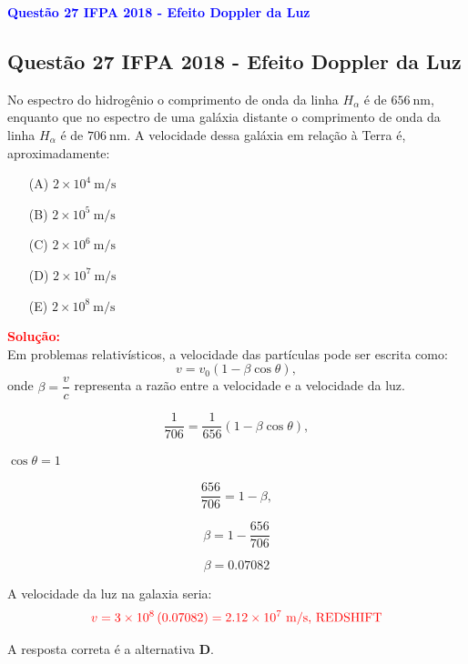 \begin{flushleft}
\textbf{\textcolor{blue}{\Large Quest\~ao 27 IFPA 2018 - Efeito Doppler da Luz}}\\
\noindent

\subsection{Quest\~ao 27 IFPA 2018 - Efeito Doppler da Luz}

No espectro do hidrogênio o comprimento de onda da linha $H_\alpha$ é de $656\ \text{nm}$, enquanto que no 
espectro de uma galáxia distante o comprimento de onda da linha $H_\alpha$ é de $706\ \text{nm}$. A velocidade dessa 
galáxia em relação à Terra é, aproximadamente:

\begin{itemize}
\item[(A)] $2 \times 10^4\ \text{m/s}$
\item[(B)] $2 \times 10^5\ \text{m/s}$
\item[(C)] $2 \times 10^6\ \text{m/s}$
\item[(D)] $2 \times 10^7\ \text{m/s}$
\item[(E)] $2 \times 10^8\ \text{m/s}$
\end{itemize}

\vspace{0.5cm}

\textcolor{red}{\textbf{Solução:}}\\

Em problemas relativ\'isticos, a velocidade das part\'iculas pode ser escrita como:
\[
v = v_0 \left(1 - \beta \cos\theta \right),
\]
onde $\beta = \dfrac{v}{c}$ representa a raz\~ao entre a velocidade e a velocidade da luz.  

\[
\frac{1}{706} = \frac{1}{656}(1 - \beta \cos\theta),
\]

$\cos\theta = 1$

\[
\frac{656}{706} = 1 - \beta,
\]

\[
\beta  = 1 - \frac{656}{706}
\]

\[
\boxed{
\beta  = 0.07082
}
\]

A velocidade da luz na galaxia seria:
\[
\textcolor{red}{v = 3 \times 10^8 \left(0.07082 \right) = 2.12 \times 10^7\ \text{m/s,  REDSHIFT}}
\]





\medskip
A resposta correta é a alternativa \colorbox{green!50}{\textbf{D}}.

\end{flushleft}


